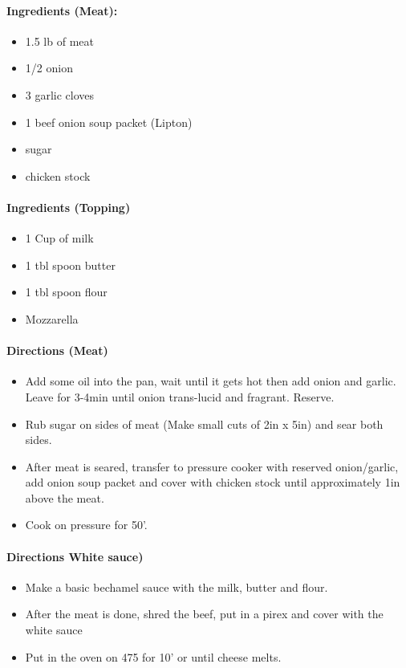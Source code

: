 \documentclass{article}
\begin{document}
\paragraph{Ingredients (Meat):}
\begin{itemize}
	\item 1.5 lb of meat
	\item 1/2 onion
	\item 3 garlic cloves
	\item 1 beef onion soup packet (Lipton)
	\item sugar
	\item chicken stock
\end{itemize}

\paragraph{Ingredients (Topping)}
\begin{itemize}
	\item 1 Cup of milk
	\item 1 tbl spoon butter
	\item 1 tbl spoon flour
	\item Mozzarella
\end{itemize}

\paragraph{Directions (Meat)}
\begin{itemize}
	\item Add some oil into the pan, wait until it gets hot then add onion and garlic. Leave for 3-4min until onion trans-lucid and fragrant. Reserve.
	\item Rub sugar on sides of meat (Make small cuts of 2in x 5in) and sear both sides.
	\item After meat is seared, transfer to pressure cooker with reserved onion/garlic, add onion soup packet and cover with chicken stock until approximately 1in above the meat.
	\item Cook on pressure for 50'.
\end{itemize}

\paragraph{Directions White sauce)}
\begin{itemize}
	\item Make a basic bechamel sauce with the milk, butter and flour.
	\item After the meat is done, shred the beef, put in a pirex and cover with the white sauce
	\item Put in the oven on 475 for 10' or until cheese melts.
\end{itemize}
\end{document}
